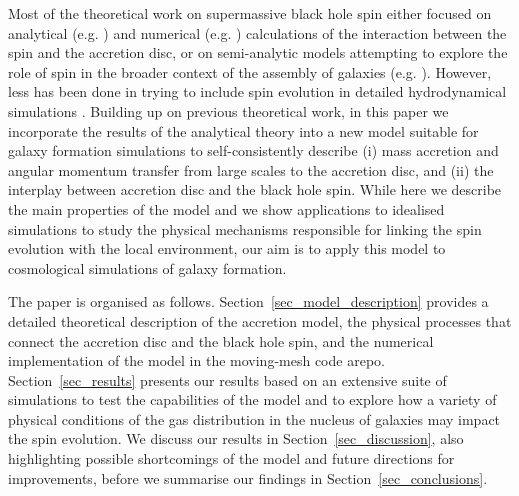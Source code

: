 \documentclass[a4paper,fleqn,usenatbib]{mnras}
\begin{document}
Most of the theoretical work on supermassive black hole spin either focused on analytical (e.g. \citealt{king+05,martin+07,perego+09,dotti+13}) and numerical (e.g. \citealt{fragile+07,tchekhovskoy+11,nixon+12b}) calculations of the interaction between the spin and the accretion disc, or on semi-analytic models attempting to explore the role of spin in the broader context of the assembly of galaxies (e.g. \citealt{berti+08, fanidakis+11,volonteri+13}).
However, less has been done in trying to include spin evolution in detailed hydrodynamical simulations \citep{sijacki+09,maio+13,dubois+14a, dubois+14b}.
Building up on previous theoretical work, in this paper we incorporate the results of the analytical theory into a new model suitable for galaxy formation simulations to self-consistently describe (i) mass accretion and angular momentum transfer from large scales to the accretion disc, and (ii) the interplay between accretion disc and the black hole spin.
While here we describe the main properties of the model and we show applications to idealised simulations to study the physical mechanisms responsible for linking the spin evolution with the local environment, our aim is to apply this model to cosmological simulations of galaxy formation. 

The paper is organised as follows.
Section~\ref{sec_model_description} provides a detailed theoretical description of the accretion model, the physical processes that connect the accretion disc and the black hole spin, and the numerical implementation of the model in the moving-mesh code {\sc arepo}. 
Section~\ref{sec_results} presents our results based on an extensive suite of simulations to test the capabilities of the model and to explore how a variety of physical conditions of the gas distribution in the nucleus of galaxies may impact the spin evolution.
We discuss our results in Section~\ref{sec_discussion}, also highlighting possible shortcomings of the model and future directions for improvements, before we summarise our findings in Section~\ref{sec_conclusions}.

\end{document}
